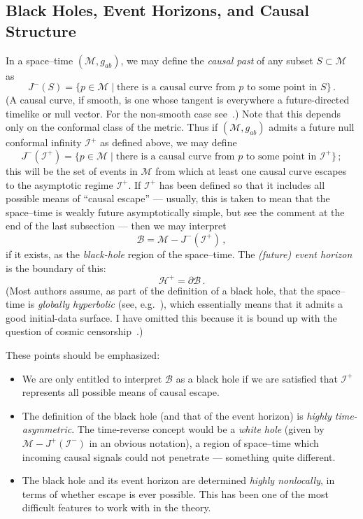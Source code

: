 \documentclass[12pt]{article}
\newcommand{\scrif}{{{\mathscr I}^{+}}}
\newcommand{\scrip}{{{\mathscr I}^{-}}}
\newcommand{\B}{{\mathscr B}} %
\newcommand{\Hf}{{{\mathscr H}^{+}}} %
\newcommand{\MM}{{\mathscr M}}
\begin{document}
\subsection{Black Holes, Event Horizons, and Causal Structure}

In a space--time $(\MM ,g_{ab})$, we may define the {\em causal past} of any subset $S\subset \MM$ as
\begin{equation} 
  J^-(S)=\{  p\in \MM\mid\mbox{there is a causal curve from }p\mbox{ to some point in }S\}\, .
\end{equation}
(A causal curve, if smooth, is one whose tangent is everywhere a future-directed timelike or null vector.  For the non-smooth case see~\citep{Penrose:1972}.)  Note that this depends only on the conformal class of the metric.  Thus if $(\MM ,g_{ab})$ admits a future null conformal infinity $\scrif$ as defined above, we may define
\begin{equation} 
  J^-(\scrif )=\{  p\in \MM\mid\mbox{there is a causal curve from }p\mbox{ to some point in }\scrif\}\, ;
\end{equation}
this will be the set of events in $\MM$ from which at least one causal curve escapes to the asymptotic regime $\scrif$.  If $\scrif$ has been defined so that it includes all possible means of ``causal escape'' --- usually, this is taken to mean that the space--time is weakly future asymptotically simple, but see the comment at the end of the last subsection --- then we may interpret
\begin{equation}
 \B =\MM -J^-(\scrif )\, ,
\end{equation}
if it exists, as the {\em black-hole} region of the space--time.  The {\em (future) event horizon} is the boundary of this:
\begin{equation}
\Hf =\partial\B\, .
\end{equation}
(Most authors assume, as part of the definition of a black hole, that the space--time is {\em globally hyperbolic} (see, e.g.~\citep{Penrose:1972}), which essentially means that it admits a good initial-data surface.  I have omitted this because it is bound up with the question of cosmic censorship~\citep{Penrose:1980}.)

These points should be emphasized:  
\begin{itemize}
\item
We are only entitled to interpret $\B$ as a black hole if we are satisfied that $\scrif$ represents all possible means of causal escape.
\item
The definition of the black hole (and that of the event horizon) is {\em highly time-asymmetric}.  The time-reverse concept would be a {\em white hole} (given by $\MM -J^+(\scrip )$ in an obvious notation), a region of space--time which incoming causal signals could not penetrate --- something quite different.
\item
The black hole and its event horizon are determined {\em highly nonlocally}, in terms of whether escape is ever possible.  This has been one of the most difficult features to work with in the theory.
\end{itemize}
\end{document}
